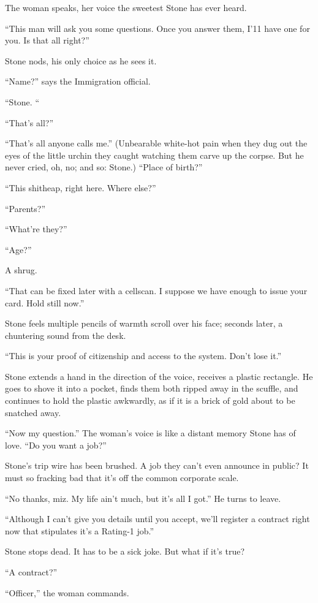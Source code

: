 The woman speaks, her voice the sweetest Stone has ever heard.

``This man will ask you some questions. Once you answer them, I'11 have one for you. Is that all right?''

Stone nods, his only choice as he sees it.

``Name?'' says the Immigration official.

``Stone. ``

``That's all?''

``That's all anyone calls me.'' (Unbearable white-hot pain when they dug out the eyes of the little urchin they caught watching them carve up the corpse. But he never cried, oh, no; and so: Stone.) ``Place of birth?''

``This shitheap, right here. Where else?''

``Parents?''

``What're they?''

``Age?''

A shrug.

``That can be fixed later with a cellscan. I suppose we have enough to issue your card. Hold still now.''

Stone feels multiple pencils of warmth scroll over his face; seconds later, a chuntering sound from the desk.

``This is your proof of citizenship and access to the system. Don't lose it.''

Stone extends a hand in the direction of the voice, receives a plastic rectangle. He goes to shove it into a pocket, finds them both ripped away in the scuffle, and continues to hold the plastic awkwardly, as if it is a brick of gold about to be snatched away.

``Now my question.'' The woman's voice is like a distant memory Stone has of love. ``Do you want a job?''

Stone's trip wire has been brushed. A job they can't even announce in public? It must so fracking bad that it's off the common corporate scale.

``No thanks, miz. My life ain't much, but it's all I got.'' He turns to leave.

``Although I can't give you details until you accept, we'll register a contract right now that stipulates it's a Rating-1 job.''

Stone stops dead. It has to be a sick joke. But what if it's true?

``A contract?''

``Officer,'' the woman commands.

